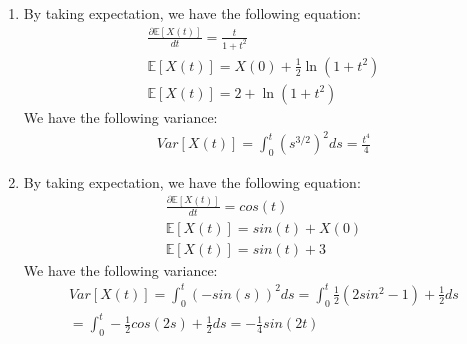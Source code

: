 \documentclass[12pt,twoside, letter]{exam}
\theoremstyle{definition}
\newcommand{\ee}{\mathbb{E}}
\begin{document}
\begin{solution}
  \begin{enumerate}
    \item By taking expectation, we have the following equation:
      \begin{align*}
        \frac{\partial{\ee[X(t)]}}{dt} = \frac{t}{1+t^2} \\
        \ee[X(t)] = X(0) + \frac{1}{2}\ln(1+t^2) \\
        \ee[X(t)] = 2 + \ln(1+t^2)
      \end{align*}
      We have the following variance: \\
        \begin{align*}
          Var[X(t)] = \int^t_0 (s^{3/2})^2 ds = \frac{t^4}{4}
        \end{align*}
    \item By taking expectation, we have the following equation:
      \begin{align*}
        \frac{\partial{\ee[X(t)]}}{dt} = cos(t) \\
        \ee[X(t)] = sin(t) + X(0) \\
        \ee[X(t)] = sin(t) + 3
      \end{align*}
      We have the following variance: \\
        \begin{align*}
          Var[X(t)] = \int^t_0 (-sin(s))^2 ds = \int^t_0 \frac{1}{2}(2sin^2 - 1) + \frac{1}{2} ds \\
          = \int^t_0 -\frac{1}{2}cos(2s) + \frac{1}{2} ds = -\frac{1}{4}sin(2t)
        \end{align*}
  \end{enumerate}
\end{solution}
\end{document}
